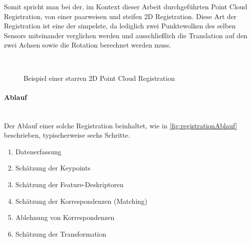 Somit spricht man bei der, im Kontext dieser Arbeit durchgeführten Point Cloud Registration, von einer paarweisen und steifen 2D Registration.
Diese Art der Registration ist eine der simpelste, da lediglich zwei Punktewolken des selben Sensors miteinander verglichen werden 
und ausschließlich die Translation auf den zwei Achsen sowie die Rotation berechnet werden muss.

\begin{figure}[H]
    \centering
     \\
    \caption{Beispiel einer starren 2D Point Cloud Registration}
    \label{fig:registrationExample}
\end{figure}

\paragraph{Ablauf} \mbox{}\\
Der Ablauf einer solche Registration beinhaltet, wie in \ref{fig:registrationAblauf} beschrieben, typischerweise sechs Schritte.
\begin{enumerate}[leftmargin=*]
    \item Datenerfassung
    \item Schätzung der Keypoints
    \item Schätzung der Feature-Deskriptoren
    \item Schätzung der Korrespondenzen (Matching)
    \item Ablehnung von Korrespondenzen
    \item Schätzung der Transformation
\end{enumerate}

